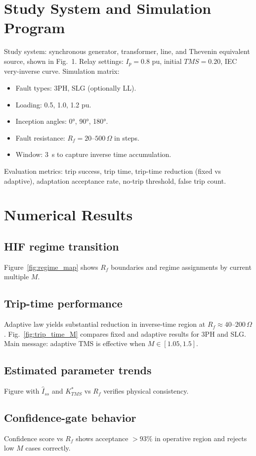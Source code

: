 \documentclass[10pt,journal,compsoc]{IEEEtran}
\begin{document}
\section{Study System and Simulation Program}
Study system: synchronous generator, transformer, line, and Thevenin equivalent source, shown in Fig.~1. Relay settings: $I_p=0.8$ pu, initial $TMS=0.20$, IEC very-inverse curve. Simulation matrix:
\begin{itemize}
  \item Fault types: 3PH, SLG (optionally LL).
  \item Loading: 0.5, 1.0, 1.2 pu.
  \item Inception angles: \ang{0}, \ang{90}, \ang{180}.
  \item Fault resistance: $R_f=20$--$500\,\Omega$ in steps.
  \item Window: 3~s to capture inverse time accumulation.
\end{itemize}
Evaluation metrics:
trip success, trip time, trip-time reduction (fixed vs adaptive), adaptation acceptance rate, no-trip threshold, false trip count.

\section{Numerical Results}
\subsection{HIF regime transition}
Figure~\ref{fig:regime_map} shows $R_f$ boundaries and regime assignments by current multiple $M$.

\subsection{Trip-time performance}
Adaptive law yields substantial reduction in inverse-time region at $R_f\approx 40$--$200\,\Omega$. Fig.~\ref{fig:trip_time_M} compares fixed and adaptive results for 3PH and SLG. Main message: adaptive TMS is effective when $M \in [1.05, 1.5]$.

\subsection{Estimated parameter trends}
Figure with $\hat{I}_{ss}$ and $K_{TMS}^*$ vs $R_f$ verifies physical consistency.

\subsection{Confidence-gate behavior}
Confidence score vs $R_f$ shows acceptance $>93\%$ in operative region and rejects low $M$ cases correctly.
\end{document}
